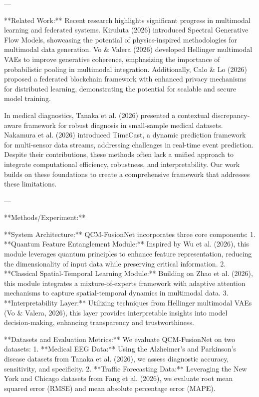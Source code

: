 ---

**Related Work:**  
Recent research highlights significant progress in multimodal learning and federated systems. Kiruluta (2026) introduced Spectral Generative Flow Models, showcasing the potential of physics-inspired methodologies for multimodal data generation. Vo & Valera (2026) developed Hellinger multimodal VAEs to improve generative coherence, emphasizing the importance of probabilistic pooling in multimodal integration. Additionally, Calo & Lo (2026) proposed a federated blockchain framework with enhanced privacy mechanisms for distributed learning, demonstrating the potential for scalable and secure model training.  

In medical diagnostics, Tanaka et al. (2026) presented a contextual discrepancy-aware framework for robust diagnosis in small-sample medical datasets. Nakamura et al. (2026) introduced TimeCast, a dynamic prediction framework for multi-sensor data streams, addressing challenges in real-time event prediction. Despite their contributions, these methods often lack a unified approach to integrate computational efficiency, robustness, and interpretability. Our work builds on these foundations to create a comprehensive framework that addresses these limitations.  

---

**Methods/Experiment:**  

**System Architecture:**  
QCM-FusionNet incorporates three core components:  
1. **Quantum Feature Entanglement Module:** Inspired by Wu et al. (2026), this module leverages quantum principles to enhance feature representation, reducing the dimensionality of input data while preserving critical information.  
2. **Classical Spatial-Temporal Learning Module:** Building on Zhao et al. (2026), this module integrates a mixture-of-experts framework with adaptive attention mechanisms to capture spatial-temporal dynamics in multimodal data.  
3. **Interpretability Layer:** Utilizing techniques from Hellinger multimodal VAEs (Vo & Valera, 2026), this layer provides interpretable insights into model decision-making, enhancing transparency and trustworthiness.  

**Datasets and Evaluation Metrics:**  
We evaluate QCM-FusionNet on two datasets:  
1. **Medical EEG Data:** Using the Alzheimer's and Parkinson's disease datasets from Tanaka et al. (2026), we assess diagnostic accuracy, sensitivity, and specificity.  
2. **Traffic Forecasting Data:** Leveraging the New York and Chicago datasets from Fang et al. (2026), we evaluate root mean squared error (RMSE) and mean absolute percentage error (MAPE).  

